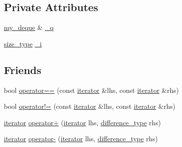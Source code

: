 \subsection*{Private Attributes}
\begin{DoxyCompactItemize}
\item 
\hyperlink{classmy__deque}{my\-\_\-deque} \& \hyperlink{classmy__deque_1_1iterator_ad9afe5fa6123a2b3a07e640b248ec097}{\-\_\-q}
\item 
\hyperlink{classmy__deque_a61e5e5317fe72a381ce4d45f09544b02}{size\-\_\-type} \hyperlink{classmy__deque_1_1iterator_ac5b4cfa68ec2b6cee397e3b4941cdeef}{\-\_\-i}
\end{DoxyCompactItemize}
\subsection*{Friends}
\begin{DoxyCompactItemize}
\item 
bool \hyperlink{classmy__deque_1_1iterator_a27d0df37bd079bf4e62faa0b468b060c}{operator==} (const \hyperlink{classmy__deque_1_1iterator}{iterator} \&lhs, const \hyperlink{classmy__deque_1_1iterator}{iterator} \&rhs)
\item 
bool \hyperlink{classmy__deque_1_1iterator_aad2b3926ed1e2db6f22ca3117766181b}{operator!=} (const \hyperlink{classmy__deque_1_1iterator}{iterator} \&lhs, const \hyperlink{classmy__deque_1_1iterator}{iterator} \&rhs)
\item 
\hyperlink{classmy__deque_1_1iterator}{iterator} \hyperlink{classmy__deque_1_1iterator_aaf128f38c16b5a8284f51a9c69f6fd77}{operator+} (\hyperlink{classmy__deque_1_1iterator}{iterator} lhs, \hyperlink{classmy__deque_1_1iterator_ac5f62e8566ad92478931c2abd9ac6596}{difference\-\_\-type} rhs)
\item 
\hyperlink{classmy__deque_1_1iterator}{iterator} \hyperlink{classmy__deque_1_1iterator_ab8892736ecb2ffe5f6b9ac9b9dbb60c0}{operator-\/} (\hyperlink{classmy__deque_1_1iterator}{iterator} lhs, \hyperlink{classmy__deque_1_1iterator_ac5f62e8566ad92478931c2abd9ac6596}{difference\-\_\-type} rhs)
\end{DoxyCompactItemize}


